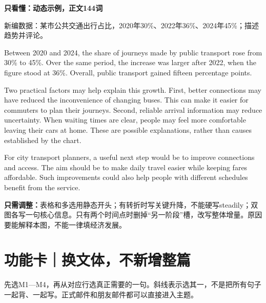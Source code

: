 \documentclass[11pt,a4paper,fontset=macnew]{ctexart}
\newenvironment{example}{\begingroup\fontsize{10.5}{14}\selectfont\setlength{\parskip}{4pt}}{\par\endgroup}
\begin{document}
\par\vspace{5pt}\noindent\textbf{只看懂：动态示例，正文144词}\par\nopagebreak
{\small 新编数据：某市公共交通出行占比，2020年30\%、2022年36\%、2024年45\%；描述趋势并评论。}\par
\begin{example}
Between 2020 and 2024, the share of journeys made by public transport rose from 30\% to 45\%. Over the same period, the increase was larger after 2022, when the figure stood at 36\%. Overall, public transport gained fifteen percentage points.

Two practical factors may help explain this growth. First, better connections may have reduced the inconvenience of changing buses. This can make it easier for commuters to plan their journeys. Second, reliable arrival information may reduce uncertainty. When waiting times are clear, people may feel more comfortable leaving their cars at home. These are possible explanations, rather than causes established by the chart.

For city transport planners, a useful next step would be to improve connections and access. The aim should be to make daily travel easier while keeping fares affordable. Such improvements could also help people with different schedules benefit from the service.

\end{example}
{\small\textbf{只需调整：}表格和多选用静态开头；有转折时写关键升降，不能硬写steadily；双图各写一句核心信息。只有两个时间点时删掉“另一阶段”槽，改写整体增量。原因要能解释本图，不能一律填经济发展。}\par
\clearpage\section*{功能卡｜换文体，不新增整篇}
先选M1—M4，再从对应行选真正需要的一句。斜线表示选其一，不是把所有句子一起背、一起写。正式邮件和朋友邮件都可以直接进入主题。
\end{document}
